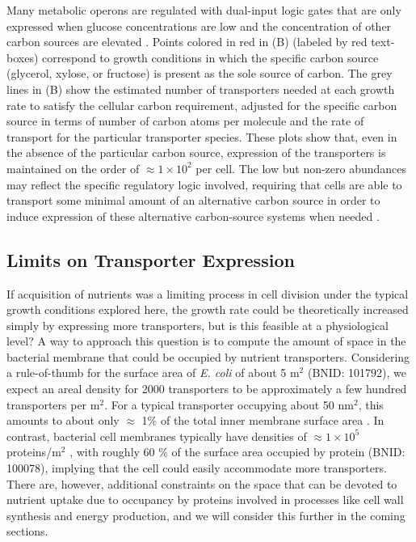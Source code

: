 Many metabolic operons are regulated with dual-input logic gates that are
only expressed when glucose concentrations are low and the concentration of
other carbon sources are elevated \citep{gama-castro2016, zhang2014a,
gama-castro2016, belliveau2018, ireland2020}. Points colored in red in
(B) (labeled by red text-boxes) correspond to growth
conditions in which the specific carbon source (glycerol, xylose, or
fructose) is present as the sole source of carbon. The grey lines in
(B) show the estimated number of transporters needed at
each growth rate to satisfy the cellular carbon requirement, adjusted for the
specific carbon source in terms of number of carbon atoms per molecule and
the rate of transport for the particular transporter species. These plots
show that, even in the absence of the particular carbon source, expression of the
transporters is maintained on the order of $\approx 1 \times 10^2$ per cell. The low but
non-zero abundances may reflect the specific regulatory logic involved,
requiring that cells are able to transport some minimal amount of an
alternative carbon source in order to induce expression of these alternative
carbon-source systems when needed \citep{laxhuber2020}.

\subsection{Limits on Transporter Expression}
If acquisition of nutrients was a limiting process in cell division under the
typical growth conditions explored here, the growth rate could be theoretically
increased simply by expressing more transporters, but is this feasible at a
physiological level? A way to approach this question is to compute the amount of
space in the bacterial membrane that could be occupied by nutrient transporters.
Considering a rule-of-thumb for the surface area of \textit{E. coli} of about 5
\textmu m$^2$ (BNID: 101792), we expect an areal density for 2000 transporters
to be approximately a few hundred transporters per \textmu m$^2$. For a typical transporter
occupying about 50 nm$^2$, this amounts to about only $\approx$ 1\% of the total
inner membrane surface area \citep{szenk2017}. In contrast, bacterial cell membranes
typically have densities of $\approx 1 \times 10^5$ proteins/\textmu m$^2$ \citep{phillips2018},
with roughly 60 \% of the surface area occupied by protein (BNID: 100078),
implying that the cell could easily accommodate more transporters. There are,
however, additional constraints on the space that  can be devoted to nutrient
uptake due to occupancy by proteins involved in processes like cell wall
synthesis and energy production, and we will consider this further in the coming
sections.
